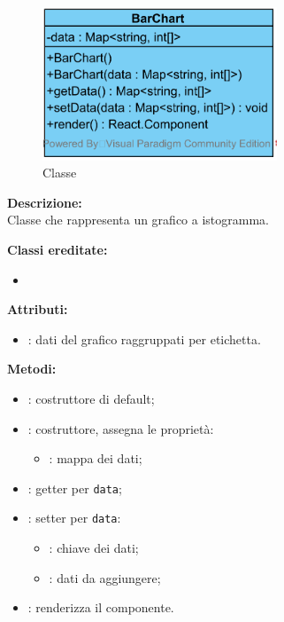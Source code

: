 \paragraph[::BarChart]{\class}\mbox{}\\ \label{\class}
\begin{figure}[H]
	\centering
	\includegraphics[width=7cm]{./diagrammi/framework/view/gui/barchart.png}
	\caption{Classe \class}
\end{figure}
\textbf{Descrizione:}\\
Classe che rappresenta un grafico a istogramma.


\textbf{Classi ereditate:}
\begin{itemize}
	\item {}
\end{itemize}


\textbf{Attributi:}
\begin{itemize}
	\item {}: dati del grafico raggruppati per etichetta.
\end{itemize}

\textbf{Metodi:}
\begin{itemize}
	\item {}: costruttore di default;
	\item {}: costruttore, assegna le proprietà:
	\begin{itemize}
		\item {}: mappa dei dati;
	\end{itemize}
	\item {}: getter per \texttt{data};
	\item {}: setter per \texttt{data}:
	\begin{itemize}
		\item {}: chiave dei dati;
		\item {}: dati da aggiungere;
	\end{itemize}
	\item {}: renderizza il componente.
\end{itemize}

